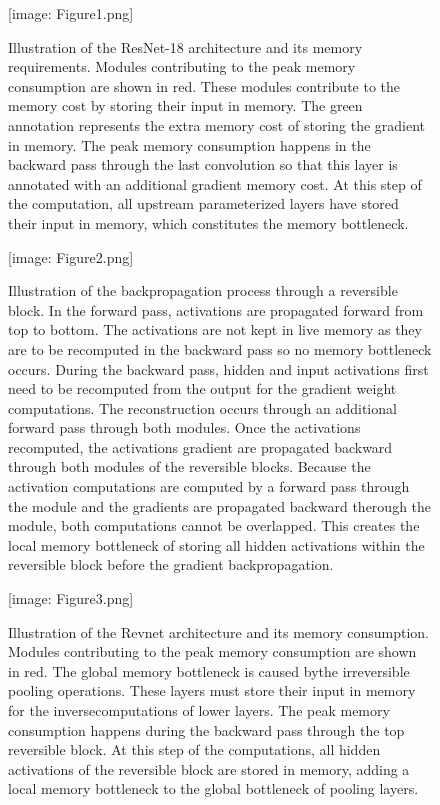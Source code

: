 \documentclass[twocolumn]{bmcart}
\def\texttt{[image: ]}
\begin{document}
\begin{backmatter}
\begin{figure}[t]
\texttt{[image: Figure1.png]}
\caption{
Illustration of the ResNet-18 architecture and its memory requirements.
Modules contributing to the peak memory consumption are shown in red.
These modules contribute to the memory cost by storing their input in memory.
The green annotation represents the extra memory cost of storing the gradient in memory.
The peak memory consumption happens in the backward pass through the last convolution so that this layer is annotated with an additional gradient memory cost.
At this step of the computation, all upstream parameterized layers have stored their input in memory, which constitutes the memory bottleneck.  
}
\end{figure}

\begin{figure}[t]
\texttt{[image: Figure2.png]}
\caption{
Illustration of the backpropagation process through a reversible block.
In the forward pass, activations are propagated forward from top to bottom.
The activations are not kept in live memory as they are to be recomputed in the backward pass so no memory bottleneck occurs.
During the backward pass, hidden and input activations first need to be recomputed from the output for the gradient weight computations.
The reconstruction occurs through an additional forward pass through both modules. 
Once the activations recomputed, the activations gradient are propagated backward through both modules of the reversible blocks.
Because the activation computations are computed by a forward pass through the module and the gradients are propagated backward therough the module,
both computations cannot be overlapped.
This creates the local memory bottleneck of storing all hidden activations within the reversible block before the gradient backpropagation.
}
\end{figure}

\begin{figure}[t]
\texttt{[image: Figure3.png]}
\caption{
Illustration of the Revnet architecture and its memory consumption.
Modules contributing to the peak memory consumption are shown in red.
The global memory bottleneck is caused bythe irreversible pooling operations.
These layers must store their input in memory for the inversecomputations of lower layers.
The peak memory consumption happens during the backward pass through the top reversible block.
At this step of the computations, all hidden activations of the reversible block are stored in memory,
adding a local memory bottleneck to the global bottleneck of pooling layers.
}
\end{figure}


\end{backmatter}
\end{document}

